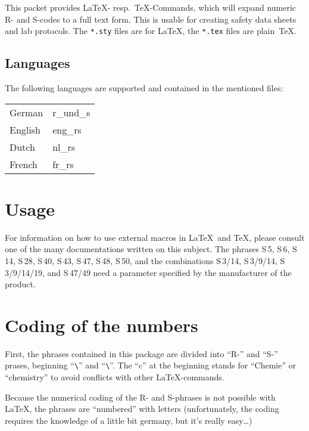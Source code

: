 \documentclass[pagesize=auto, fontsize=12pt, headings=normal]{scrartcl}
\makeatletter
\newcommand*{\cs}[1]{\texttt{\textbackslash#1}}
\newcommand*{\cmd}[1]{\cs{\expandafter\@gobble\string#1}}
\makeatother
\begin{document}
This packet provides \LaTeX- resp.\ \TeX-Commands, which will expand numeric R-
and S-codes to a full text form. This is usable for creating safety data
sheets and lab protocols. The \texttt{*.sty} files are for \LaTeX, the \texttt{*.tex} files are
plain~\TeX.


\subsection{Languages}

The following languages are supported and contained in the mentioned files:

\medskip
\begin{tabular}{@{}l>{\ttfamily}l@{}}
  German  & r\_und\_s \\
  English & eng\_rs   \\
  Dutch   & nl\_rs    \\
  French  & fr\_rs    \\
\end{tabular}


\section{Usage}

For information on how to use external macros in \LaTeX\ and \TeX, please
consult one of the many documentations written on this subject. 
The phrases S\,5, S\,6, S\,14, S\,28, S\,40, S\,43, S\,47, S\,48, S\,50, and the combinations
S\,3/14, S\,3/9/14, S\,3/9/14/19, and S\,47/49 need a parameter specified by the
manufacturer of the product.


\section{Coding of the numbers}

First, the phrases contained in this package are divided into \enquote{R-} and \enquote{S-}
prases, beginning \enquote{\cmd{\cr}} and \enquote{\cmd{\cs}}. The \enquote{c} at the beginning stands for
\enquote{Chemie} or \enquote{chemistry} to avoid conflicts with other \LaTeX-commands.

Because the numerical coding of the R- and S-phrases is not possible with
\LaTeX, the phrases are \enquote{numbered} with letters (unfortunately, the coding
requires the knowledge of a little bit germany, but it's really easy\dots)
\end{document}
